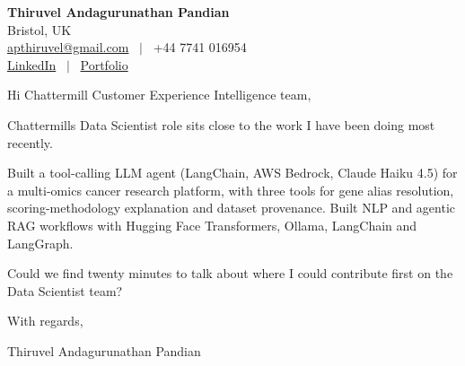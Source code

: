 \documentclass[11pt,a4paper]{article}
\begin{document}
\raggedright
\pagestyle{empty}

\begin{center}
    {\LARGE \color{linkblue} \textbf{Thiruvel Andagurunathan Pandian}}\\[0.2cm]
    Bristol, UK \\
    \href{mailto:apthiruvel@gmail.com}{apthiruvel@gmail.com} \ $|$ \ +44 7741 016954 \\
\href{https://www.linkedin.com/in/thiruvel-a-p/}{LinkedIn} \ $|$ \ \href{https://thiruvel-ap.github.io/PersonalPortfolio/}{Portfolio}
\end{center}

\vspace{0.4cm}

\noindent
Hi Chattermill Customer Experience Intelligence team,

Chattermill\textquotesingle{}s Data Scientist role sits close to the work I have been doing most recently.

Built a tool-calling LLM agent (LangChain, AWS Bedrock, Claude Haiku 4.5) for a multi-omics cancer research platform, with three tools for gene alias resolution, scoring-methodology explanation and dataset provenance. Built NLP and agentic RAG workflows with Hugging Face Transformers, Ollama, LangChain and LangGraph.

Could we find twenty minutes to talk about where I could contribute first on the Data Scientist team?

\vspace{0.5cm}

With regards,

Thiruvel Andagurunathan Pandian
\end{document}
